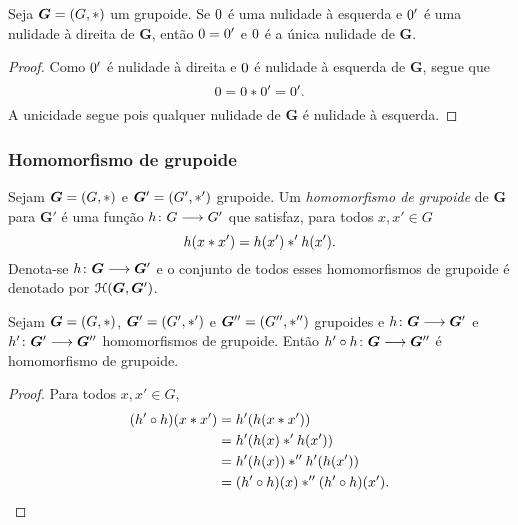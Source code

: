 \begin{proposition}
\label{prop:unic.nulidade}
Seja $\bm G = (G,\ast)$ um grupoide. Se $0$ é uma nulidade à esquerda e $0'$ é uma nulidade à direita de $\bm G$, então $0 = 0'$ e $0$ é a única nulidade de $\bm G$.
\end{proposition}
\begin{proof}
Como $0'$ é nulidade à direita e $0$ é nulidade à esquerda de $\bm G$, segue que
	\begin{equation*}
	0 = 0 \ast 0' = 0'.
	\end{equation*}
A unicidade segue pois qualquer nulidade de $\bm G$ é nulidade à esquerda.
\end{proof}



\subsubsection{Homomorfismo de grupoide}

\begin{definition}
Sejam $\bm G=(G,\ast)$ e $\bm G'=(G',\ast')$ grupoide. Um \emph{homomorfismo de grupoide} de $\bm G$ para $\bm G'$ é uma função ${h}\colon {G} \longrightarrow {G'}$ que satisfaz, para todos $x,x' \in G$
	\begin{equation*}
	h(x \ast x')=h(x') \ast' h(x').
	\end{equation*}
Denota-se ${h}\colon {\bm G} \longrightarrow {\bm G'}$ e o conjunto de todos esses homomorfismos de grupoide é denotado por $\mathcal{H}(\bm G,\bm G')$.
\end{definition}

\begin{proposition}
\label{comp.hom.grupoide}
Sejam $\bm G=(G,\ast)$, $\bm G'=(G',\ast')$ e $\bm G''=(G'',\ast'')$ grupoides e ${h}\colon {\bm G } \longrightarrow {\bm G'}$ e ${h'}\colon {\bm G'} \longrightarrow {\bm G''}$ homomorfismos de grupoide. Então ${h' \circ h}\colon {\bm G} \longrightarrow {\bm G''}$ é homomorfismo de grupoide.
\end{proposition}
\begin{proof}
Para todos $x,x' \in G$,
	\begin{align*}
	(h' \circ h)(x \ast x') &= h'(h(x \ast x')) \\
		&= h'(h(x) \ast' h(x')) \\
		&= h'(h (x)) \ast'' h'(h(x')) \\
		&= (h' \circ h)(x) \ast'' (h' \circ h)(x').
		\qedhere
	\end{align*}
\end{proof}

